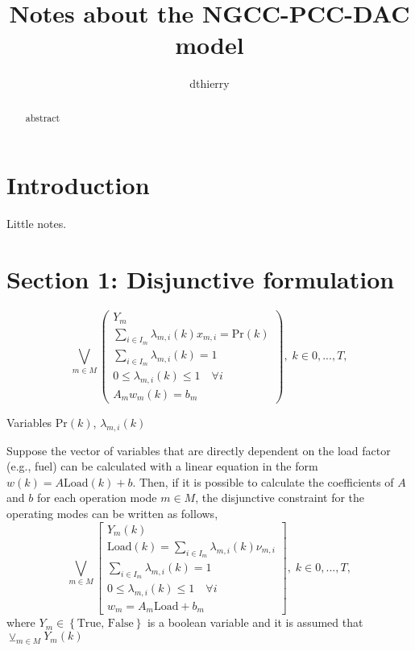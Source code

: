 \documentclass{tufte-handout}
\title{Notes about the NGCC-PCC-DAC model}
\author{dthierry}
\begin{document}
\maketitle

\begin{abstract}
\noindent abstract
\end{abstract}



\section{Introduction}

Little notes.

\section{Section 1: Disjunctive formulation}

\begin{equation}
	\bigvee_{m \in M}
	\begin{pmatrix} 
    Y_m \\
		\sum_{i \in I_m} \lambda_{m,i} \left(k \right) x_{m, i} = \text{Pr} \left(k\right)
		\\ 
		\sum_{i \in I_m} \lambda_{m,i} \left(k \right) = 1 \\
    0 \leq \lambda_{m,i} \left(k \right) \leq 1 \quad \forall i \\
    A_m w_{m}\left(k\right) = b_m
	\end{pmatrix}, \; k \in {0,...,T},
\end{equation}

Variables $\text{Pr}\left(k \right)$, $\lambda_{m,i} \left(k \right)$

Suppose the vector of variables that are directly dependent on the load factor (e.g., fuel) can be calculated with a linear equation in the form $w \left( k \right)= A \text{Load}\left(k \right) + b$. Then, if it is possible to calculate the coefficients of $A$ and $b$ for each operation mode $m \in M$, the disjunctive constraint for the operating modes can be written as follows, 
\begin{equation}
	\bigvee_{m \in M}
	\begin{bmatrix} 
    Y_m \left(k\right)\\
		\text{Load} \left(k\right) = \sum_{i \in I_m} \lambda_{m,i} \left(k \right) \nu_{m, i}
		\\ 
		\sum_{i \in I_m} \lambda_{m,i} \left(k \right) = 1 \\
    0 \leq \lambda_{m,i} \left(k \right) \leq 1 \quad \forall i \\
    w_m = A_m \text{Load} + b_m
	\end{bmatrix}, \; k \in {0,...,T},
\end{equation}
where $Y_m \in \left\{\text{True, False} \right\}$ is a boolean variable and it is assumed that $\veebar_{m \in M} Y_m \left(k\right)$
\end{document}
